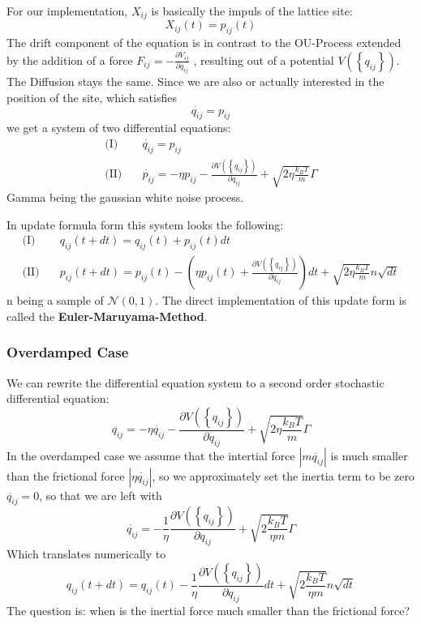 	For our implementation, $X_{ij}$ is basically the impuls of the lattice site:
	\begin{equation}
		X_{ij}(t) =	p_{ij}(t)
	\end{equation}
	The drift component of the equation is in contrast to the OU-Process extended by the addition of a force $F_{ij} =	- \frac{\partial V_{ij}}{\partial q_{ij}}$ , resulting out of a potential $V(\left\lbrace q_{ij}\right\rbrace)$. The Diffusion stays the same. Since we are also or actually interested in the position of the site, which satisfies
	\begin{equation}
		\dot{q_{ij}} =	p_{ij}
	\end{equation}
	we get a system of two differential equations:
	\begin{align}
		\text{(I)} \quad &\dot{q_{ij}} =	p_{ij} \\
		\text{(II)}\quad &\dot{p_{ij}} =	-\eta p_{ij} - \frac{\partial V(\left\lbrace q_{ij}\right\rbrace)}{\partial q_{ij}} + \sqrt{2\eta\frac{k_B T}{m}} \Gamma
	\end{align}
	Gamma being the gaussian white noise process.
	
	In update formula form this system looks the following:
	\begin{align}
		\text{(I)} \quad &q_{ij}(t + dt) =	q_{ij}(t) + p_{ij}(t) dt \\
		\text{(II)}\quad &p_{ij}(t + dt) = p_{ij}(t)	-\left(\eta p_{ij}(t) + \frac{\partial V(\left\lbrace q_{ij}\right\rbrace)}{\partial q_{ij}} \right)dt + \sqrt{2\eta\frac{k_B T}{m}} n \sqrt{dt}
	\end{align}
	n being a sample of $\mathcal{N}(0, 1)$. The direct implementation of this update form is called the \textbf{Euler-Maruyama-Method}.
	\subsubsection{Overdamped Case}
	We can rewrite the differential equation system to a second order stochastic differential equation:
	\begin{equation}
		\ddot{q_{ij}} =	-\eta \dot{q_{ij}} - \frac{\partial V(\left\lbrace q_{ij}\right\rbrace)}{\partial q_{ij}} + \sqrt{2\eta\frac{k_B T}{m}} \Gamma
	\end{equation}
	In the overdamped case we assume that the intertial force $|m \ddot{q_{ij}}|$ is much smaller than the frictional force $|\eta \dot{q_{ij}}|$, so we approximately set the inertia term to be zero $\ddot{q_{ij}} =	0$, so that we are left with
	\begin{equation}
		\dot{q_{ij}} =	- \frac{1}{\eta} \frac{\partial V(\left\lbrace q_{ij}\right\rbrace)}{\partial q_{ij}} + \sqrt{2\frac{k_B T}{\eta m}} \Gamma
	\end{equation}
	Which translates numerically to
	\begin{equation}
		q_{ij}(t + dt) = q_{ij}(t)	- \frac{1}{\eta} \frac{\partial V(\left\lbrace q_{ij}\right\rbrace)}{\partial q_{ij}}dt + \sqrt{2\frac{k_B T}{\eta m}} n \sqrt{dt}
	\end{equation}
	The question is: when is the inertial force much smaller than the frictional force?
